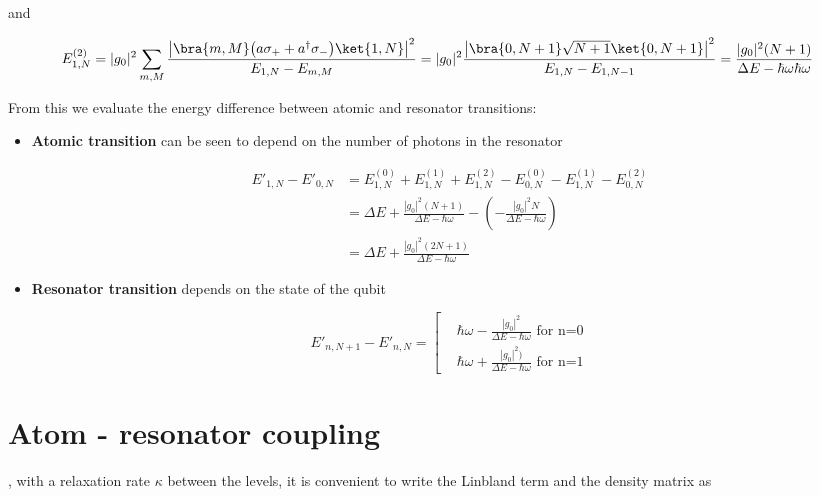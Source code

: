 \noindent and

\begin{equation}\label{sec1}
  E_{1,N}^{(2)} = |g_0|^2\sum_{m,M}\frac{\left|\bra{m,M}\big({a\sigma_{+}}+a^{\dagger}\sigma_{-}\big)\ket{1,N}\right|^2}{E_{1,N}-E_{m,M}}= |g_0|^2\frac{\left|\bra{0,N+1}\sqrt{N+1}\ket{0,N+1}\right|^2}{E_{1,N}-E_{1,N-1}} = \frac{|g_0|^2(N+1)}{\Delta E - \hbar\omega \hbar\omega}
\end{equation}

\noindent From this we evaluate the energy difference between atomic and
resonator transitions:

\begin{itemize}
\item \textbf{Atomic transition} can be seen  to depend on the number of
  photons in the resonator

  \begin{equation}\label{secAtom}\begin{aligned}
      E'_{1,N}-E'_{0,N}   &   =    E_{1,N}^{(0)}   +   E_{1,N}^{(1)}   +
      E_{1,N}^{(2)} - E_{0,N}^{(0)} -  E_{1,N}^{(1)} - E_{0,N}^{(2)} \\&
      =   \Delta    E   +   \frac{|g_0|^2(N+1)}{\Delta   E    -   \hbar\omega}   -
      (-\frac{|g_0|^2N}{\Delta     E     -      \hbar\omega})\\&     =     {\Delta
        E+\frac{|g_0|^2(2N+1)}{\Delta E - \hbar\omega}}
    \end{aligned}
  \end{equation}
\item \textbf{Resonator transition} depends on the state of the qubit

  \begin{equation}\label{secRes}
    E'_{n,N+1}-E'_{n,N} = \left[\begin{aligned}
        & \hbar\omega  -\frac{|g_0|^2}{\Delta E -  \hbar\omega} \text{ for n=0}
        \\&  \hbar\omega + {\frac{|g_0|^2)}{\Delta E -  \hbar\omega}}\text{ for n=1}
      \end{aligned}\right.
  \end{equation}
\end{itemize}

\newpage

\section{Atom - resonator coupling}
\noindent  {}, with  a relaxation  rate $  \kappa $ between  the levels,  it is
convenient to write the Linbland term and the density matrix as

